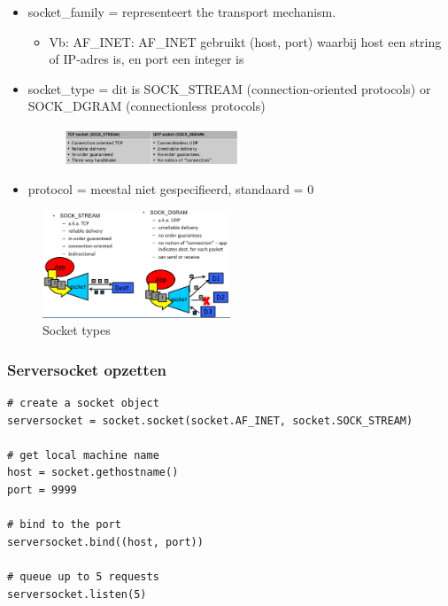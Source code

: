 \documentclass{article}
\begin{document}
\begin{itemize}
    \item socket\_family = representeert the transport mechanism.
    \begin{itemize}
        \item Vb: AF\_INET: AF\_INET gebruikt (host, port) waarbij host een string of IP-adres is, en port een integer is
    \end{itemize}
    \item socket\_type = dit is SOCK\_STREAM (connection-oriented protocols) or SOCK\_DGRAM (connectionless protocols)
    \begin{figure}[H]
        \centering
        \includegraphics[width=0.5\textwidth]{socket-type.png}
    \end{figure}
    \item protocol = meestal niet gespecifieerd, standaard = 0    
\end{itemize}


\begin{figure}[H]
    \centering
    \includegraphics[width=0.5\textwidth]{socket-module.png}
    \caption{Socket types}
\end{figure}


\subsubsection{Serversocket opzetten}

\begin{verbatim}
# create a socket object
serversocket = socket.socket(socket.AF_INET, socket.SOCK_STREAM)

# get local machine name
host = socket.gethostname()
port = 9999

# bind to the port
serversocket.bind((host, port))

# queue up to 5 requests
serversocket.listen(5)
\end{verbatim}
\end{document}
